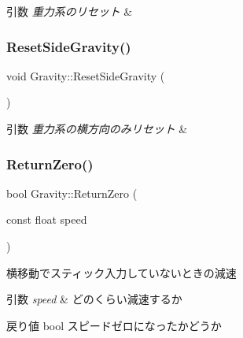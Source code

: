 \begin{DoxyParams}{引数}
{\em 重力系のリセット} & \\
\hline
\end{DoxyParams}
\mbox{\label{class_gravity_a5e430e10dea748f20c2d019e86dd339c}} 
\subsubsection{\texorpdfstring{Reset\+Side\+Gravity()}{ResetSideGravity()}}
{\footnotesize\ttfamily void Gravity\+::\+Reset\+Side\+Gravity (\begin{DoxyParamCaption}{ }\end{DoxyParamCaption})\hspace{0.3cm}{\ttfamily [inline]}}


\begin{DoxyParams}{引数}
{\em 重力系の横方向のみリセット} & \\
\hline
\end{DoxyParams}
\mbox{\label{class_gravity_a1efc862b822ca8cfea80b066ed4479f9}} 
\subsubsection{\texorpdfstring{Return\+Zero()}{ReturnZero()}}
{\footnotesize\ttfamily bool Gravity\+::\+Return\+Zero (\begin{DoxyParamCaption}\item[{const float}]{speed }\end{DoxyParamCaption})}



横移動でスティック入力していないときの減速 


\begin{DoxyParams}{引数}
{\em speed} & どのくらい減速するか \\
\hline
\end{DoxyParams}
\begin{DoxyReturn}{戻り値}
bool スピードゼロになったかどうか 
\end{DoxyReturn}
\mbox{\label{class_gravity_a74d50df160f70b19f82e382b2a90be3e}} 
